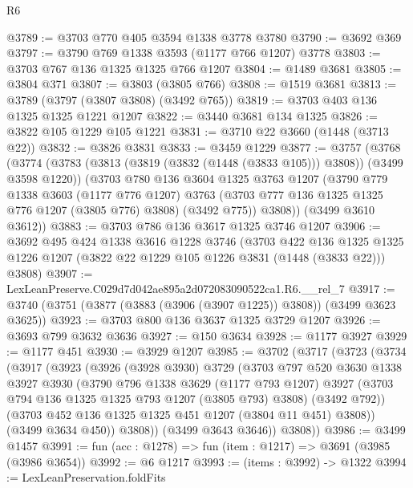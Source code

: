 \begin{lexlean}{R6}
\begin{coremodule}
@3789 := @3703 @770 @405 @3594 @1338 @3778 @3780
@3790 := @3692 @369
@3797 := @3790 @769 @1338 @3593 (@1177 @766 @1207) @3778
@3803 := @3703 @767 @136 @1325 @1325 @766 @1207
@3804 := @1489 @3681
@3805 := @3804 @371
@3807 := @3803 (@3805 @766)
@3808 := @1519 @3681
@3813 := @3789 (@3797 (@3807 @3808) (@3492 @765))
@3819 := @3703 @403 @136 @1325 @1325 @1221 @1207
@3822 := @3440 @3681 @134 @1325
@3826 := @3822 @105 @1229 @105 @1221
@3831 := @3710 @22 @3660 (@1448 (@3713 @22))
@3832 := @3826 @3831
@3833 := @3459 @1229
@3877 := @3757
    (@3768
      (@3774
        (@3783 (@3813 (@3819 (@3832 (@1448 (@3833 @105))) @3808)) (@3499 @3598 @1220))
        (@3703
          @780
          @136
          @3604
          @1325
          @3763
          @1207
          (@3790
            @779
            @1338
            @3603
            (@1177 @776 @1207)
            @3763
            (@3703 @777 @136 @1325 @1325 @776 @1207 (@3805 @776) @3808)
            (@3492 @775))
          @3808))
      (@3499 @3610 @3612))
@3883 := @3703 @786 @136 @3617 @1325 @3746 @1207
@3906 := @3692
    @495
    @424
    @1338
    @3616
    @1228
    @3746
    (@3703
      @422
      @136
      @1325
      @1325
      @1226
      @1207
      (@3822 @22 @1229 @105 @1226 @3831 (@1448 (@3833 @22)))
      @3808)
@3907 := LexLeanPreserve.C029d7d042ae895a2d072083090522ca1.R6.__rel_7
@3917 := @3740 (@3751 (@3877 (@3883 (@3906 (@3907 @1225)) @3808)) (@3499 @3623 @3625))
@3923 := @3703 @800 @136 @3637 @1325 @3729 @1207
@3926 := @3693 @799 @3632 @3636
@3927 := @150 @3634
@3928 := @1177 @3927
@3929 := @1177 @451
@3930 := @3929 @1207
@3985 := @3702
    (@3717
      (@3723
        (@3734
          (@3917
            (@3923
              (@3926
                (@3928 @3930)
                @3729
                (@3703
                  @797
                  @520
                  @3630
                  @1338
                  @3927
                  @3930
                  (@3790
                    @796
                    @1338
                    @3629
                    (@1177 @793 @1207)
                    @3927
                    (@3703 @794 @136 @1325 @1325 @793 @1207 (@3805 @793) @3808)
                    (@3492 @792))
                  (@3703 @452 @136 @1325 @1325 @451 @1207 (@3804 @11 @451) @3808))
                (@3499 @3634 @450))
              @3808))
          (@3499 @3643 @3646))
        @3808))
@3986 := @3499 @1457
@3991 := fun (acc : @1278) => fun (item : @1217) => @3691 (@3985 (@3986 @3654))
@3992 := @6 @1217
@3993 := (items : @3992) -> @1322
@3994 := LexLeanPreservation.foldFits

\end{coremodule}
\end{lexlean}
